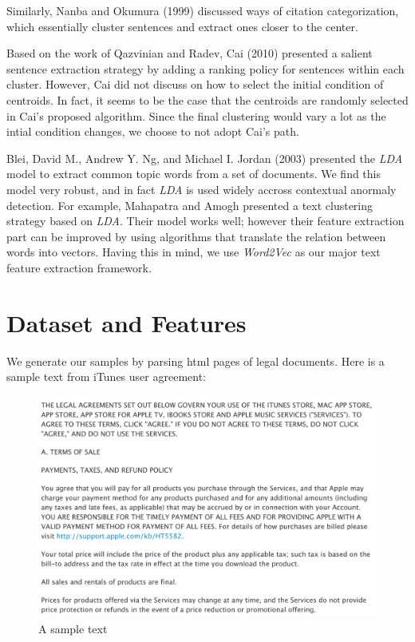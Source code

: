 \documentclass[conference,compsoc]{IEEEtran}
\begin{document}
  Similarly, Nanba and Okumura (1999) \cite{reviewcite3} discussed ways of citation categorization, which essentially cluster sentences and extract ones closer to the center. 

  Based on the work of Qazvinian and Radev, Cai (2010) \cite{reviewcite2} presented a salient sentence extraction strategy by adding a ranking policy for sentences within each cluster. However, Cai did not discuss on how to select the initial condition of centroids. In fact, it seems to be the case that the centroids are randomly selected in Cai's proposed algorithm. Since the final clustering would vary a lot as the intial condition changes, we choose to not adopt Cai's path. 

  Blei, David M., Andrew Y. Ng, and Michael I. Jordan (2003) presented the \emph{LDA} model to extract common topic words from a set of documents. We find this model very robust, and in fact \emph{LDA} is used widely accross contextual anormaly detection. For example, Mahapatra and Amogh \cite{reviewcite4} presented a text clustering strategy based on \emph{LDA}. Their model works well; however their feature extraction part can be improved by using algorithms that translate the relation between words into vectors. Having this in mind, we use \emph{Word2Vec} as our major text feature extraction framework. 

\section{Dataset and Features}
  We generate our samples by parsing html pages of legal documents. Here is a sample text from iTunes user agreement: 
  \begin{figure}[h!]
  \centering
          \includegraphics[totalheight=4cm]{legal_apple_ss.png}
      \caption{A sample text}
      \label{fig:verticalcell}
  \end{figure}
\end{document}
